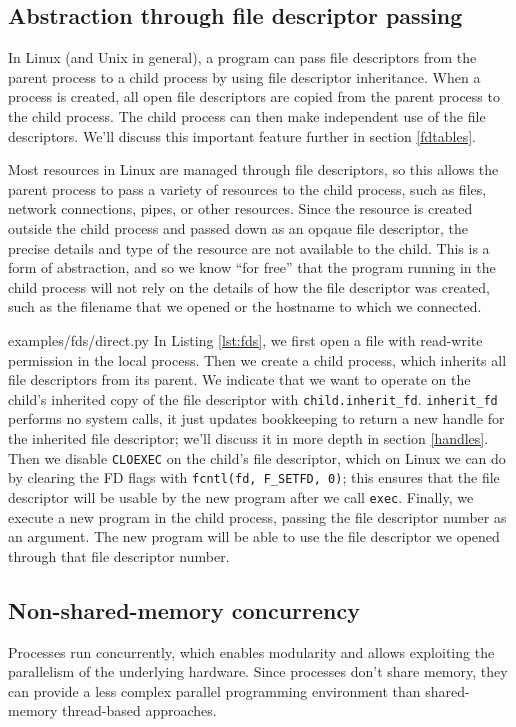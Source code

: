 \documentclass[letterpaper,twocolumn,10pt]{article}
\begin{document}
\subsection{Abstraction through file descriptor passing}\label{fd_abstraction}
In Linux (and Unix in general),
a program can pass file descriptors from the parent process to a child process
by using file descriptor inheritance.\cite{tlpi}
When a process is created, all open file descriptors are copied from the parent process to the child process.
The child process can then make independent use of the file descriptors.
We'll discuss this important feature further in section \ref{fdtables}.

Most resources in Linux are managed through file descriptors,
so this allows the parent process to pass a variety of resources to the child process,
such as files, network connections, pipes, or other resources.\cite{ucspi}
Since the resource is created outside the child process and passed down as an opqaue file descriptor,
the precise details and type of the resource are not available to the child.
This is a form of abstraction,
and so we know ``for free''
that the program running in the child process
will not rely on the details of how the file descriptor was created,
such as the filename that we opened or the hostname to which we connected.\cite{theoremsforfree}


{examples/fds/direct.py}
In Listing \ref{lst:fds},
we first open a file with read-write permission in the local process.
Then we create a child process,
which inherits all file descriptors from its parent.
We indicate that we want to operate on the child's inherited copy of the file descriptor with \verb|child.inherit_fd|.
\texttt{inherit\_fd} performs no system calls,
it just updates bookkeeping to return a new handle for the inherited file descriptor;
we'll discuss it in more depth in section \ref{handles}.
Then we disable \texttt{CLOEXEC} on the child's file descriptor,
which on Linux we can do by clearing the FD flags with \verb|fcntl(fd, F_SETFD, 0)|;
this ensures that the file descriptor will be usable by the new program after we call \texttt{exec}.
Finally, we execute a new program in the child process,
passing the file descriptor number as an argument.
The new program will be able to use the file descriptor we opened through that file descriptor number.
\subsection{Non-shared-memory concurrency}
Processes run concurrently,
which enables modularity
and allows exploiting the parallelism of the underlying hardware.
Since processes don't share memory,
they can provide a less complex parallel programming environment
than shared-memory thread-based approaches.\cite{threads}
\end{document}
